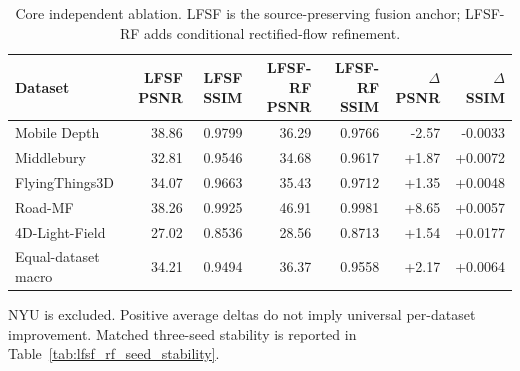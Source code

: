 \begin{table}[t]
\centering
\caption{Core independent ablation. LFSF is the source-preserving fusion anchor; LFSF-RF adds conditional rectified-flow refinement.}
\label{tab:lfsf_rf_core}
\small
\setlength{\tabcolsep}{7pt}
\renewcommand{\arraystretch}{1.08}
\begin{tabular}{@{}lrrrrrr@{}}
\toprule
Dataset & LFSF PSNR & LFSF SSIM & LFSF-RF PSNR & LFSF-RF SSIM & $\Delta$ PSNR & $\Delta$ SSIM \\
\midrule
Mobile Depth & 38.86 & 0.9799 & 36.29 & 0.9766 & -2.57 & -0.0033 \\
Middlebury & 32.81 & 0.9546 & 34.68 & 0.9617 & +1.87 & +0.0072 \\
FlyingThings3D & 34.07 & 0.9663 & 35.43 & 0.9712 & +1.35 & +0.0048 \\
Road-MF & 38.26 & 0.9925 & 46.91 & 0.9981 & +8.65 & +0.0057 \\
4D-Light-Field & 27.02 & 0.8536 & 28.56 & 0.8713 & +1.54 & +0.0177 \\
\midrule
Equal-dataset macro & 34.21 & 0.9494 & 36.37 & 0.9558 & +2.17 & +0.0064 \\
\bottomrule
\end{tabular}
\vspace{2pt}
\footnotesize{NYU is excluded. Positive average deltas do not imply universal per-dataset improvement. Matched three-seed stability is reported in Table~\ref{tab:lfsf_rf_seed_stability}.}
\end{table}
